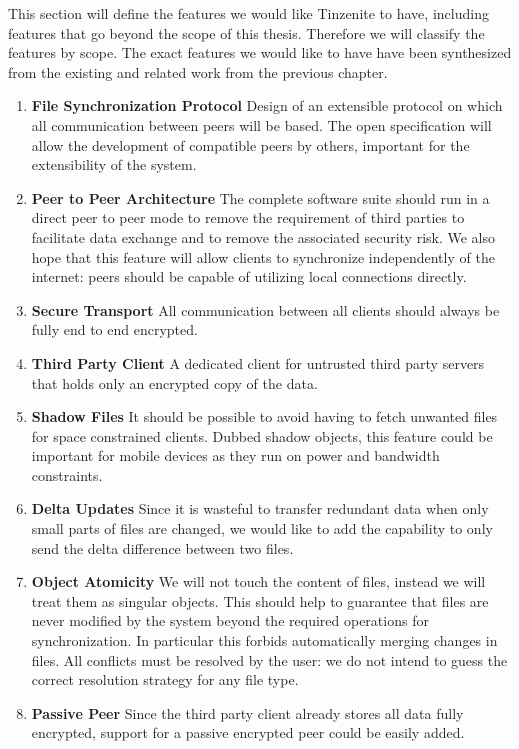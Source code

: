 This section will define the features we would like Tinzenite to have, including features that go beyond the scope of this thesis.
Therefore we will classify the features by scope.
The exact features we would like to have have been synthesized from the existing and related work from the previous chapter.

\begin{enumerate}
\item \textbf{File Synchronization Protocol}
    Design of an extensible protocol on which all communication between peers will be based.
    The open specification will allow the development of compatible peers by others, important for the extensibility of the system.
\item \textbf{Peer to Peer Architecture}
    The complete software suite should run in a direct peer to peer mode to remove the requirement of third parties to facilitate data exchange and to remove the associated security risk.
    We also hope that this feature will allow clients to synchronize independently of the internet: peers should be capable of utilizing local connections directly.
\item \textbf{Secure Transport}
    All communication between all clients should always be fully end to end encrypted.
\item \textbf{Third Party Client}
    A dedicated client for untrusted third party servers that holds only an encrypted copy of the data.
\item \textbf{Shadow Files}
    It should be possible to avoid having to fetch unwanted files for space constrained clients.
    Dubbed shadow objects, this feature could be important for mobile devices as they run on power and bandwidth constraints.
\item \textbf{Delta Updates}
    Since it is wasteful to transfer redundant data when only small parts of files are changed, we would like to add the capability to only send the delta difference between two files.
\item \textbf{Object Atomicity}
    We will not touch the content of files, instead we will treat them as singular objects.
    This should help to guarantee that files are never modified by the system beyond the required operations for synchronization.
    In particular this forbids automatically merging changes in files.
    All conflicts must be resolved by the user: we do not intend to guess the correct resolution strategy for any file type.
\item \textbf{Passive Peer}
    Since the third party client already stores all data fully encrypted, support for a passive encrypted peer could be easily added.

\end{enumerate}

